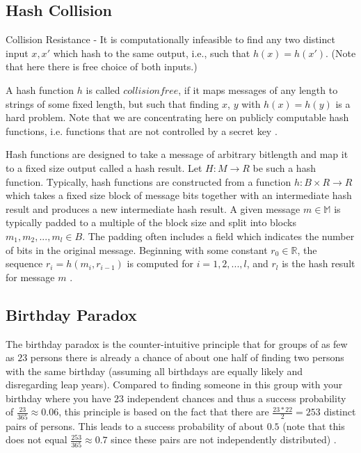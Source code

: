 \documentclass[12pt]{article}
\begin{document}
\subsection{Hash Collision}

Collision Resistance - It is computationally infeasible to find any two distinct input \(x, x'\) 
which hash to the same output, i.e., such that \(h(x) = h(x')\). (Note that here there is free 
choice of both inputs.) \cite{menezes1996handbook}

A hash function \(h\) is called \(collision free\), if it maps messages of any length to strings of
some fixed length, but such that finding \(x\), \(y\) with \(h(x) = h(y)\) is a hard problem. Note 
that we are concentrating here on publicly computable hash functions, i.e. functions that are not
controlled by a secret key \cite{damgaard1989design}.

Hash functions are designed to take a message of arbitrary bitlength and map it to a fixed size
output called a hash result. Let \(H : M \to R\) be such a hash function. Typically, 
hash functions are constructed from a function \(h: B \times R \to R\) which takes a fixed size block 
of message bits together with an intermediate hash result and produces a new intermediate hash result. 
A given message \(m \in \mathbb{M}\) is typically padded to a multiple of the block size and split 
into blocks \(m_1, m_2, ... , m_l \in B\). The padding often includes a field which indicates the 
number of bits in the original message. Beginning with some constant \(r_0 \in \mathbb{R}\), the sequence 
\(r_i = h(m_i, r_{i-1})\) is computed for \(i = 1, 2, ... , l\), and \(r_l\) is the hash result for message 
\(m\) \cite{van1999parallel}.

\subsection{Birthday Paradox}

The birthday paradox is the counter-intuitive principle that for
groups of as few as \(23\) persons there is already a chance of about one half of finding two 
persons with the same birthday (assuming all birthdays are equally likely and disregarding 
leap years). Compared to finding someone in this group with your birthday where you have 
\(23\) independent chances and thus a success probability of \(\frac{23}{365} \approx 0.06\), this principle is 
based on the fact that there are \(\frac{23 * 22}{2} = 253\) distinct pairs of persons. This leads to 
a success probability of about \(0.5\) (note that this does not equal \(\frac{253}{365} \approx 0.7\) since these 
pairs are not independently distributed) \cite{stevens2012attacks}.
\end{document}
